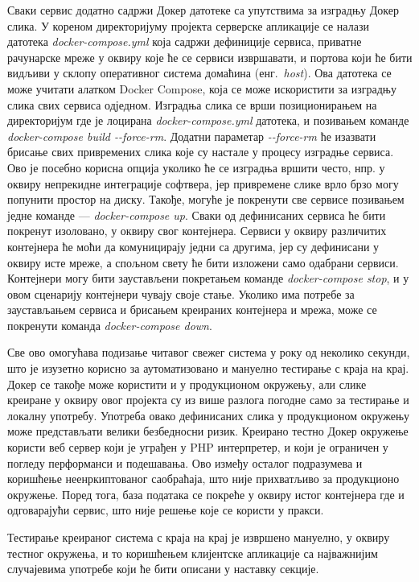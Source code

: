 \documentclass[12pt,oneside]{memoir}
\begin{document}
Сваки сервис додатно садржи Докер датотеке са упутствима за изградњу Докер слика. У кореном директоријуму пројекта серверске апликације се налази датотека \textit{docker-compose.yml} која садржи дефиниције сервиса, приватне рачунарске мреже у оквиру које ће се сервиси извршавати, и портова који ће бити видљиви у склопу оперативног система домаћина (енг.~\textit{host}). Ова датотека се може учитати алатком Docker Compose, која се може искористити за изградњу слика свих сервиса одједном. Изградња слика се врши позиционирањем на директоријум где је лоцирана \textit{docker-compose.yml} датотека, и позивањем команде \textit{docker-compose build -{}-force-rm}. Додатни параметар \textit{-{}-force-rm} ће изазвати брисање свих привремених слика које су настале у процесу изградње сервиса. Ово је посебно корисна опција уколико ће се изградња вршити често, нпр. у оквиру непрекидне интеграције софтвера, јер привремене слике врло брзо могу попунити простор на диску. Такође, могуће је покренути све сервисе позивањем једне команде --- \textit{docker-compose up}. Сваки од дефинисаних сервиса ће бити покренут изоловано, у оквиру свог контејнера. Сервиси у оквиру различитих контејнера ће моћи да комуницирају једни са другима, јер су дефинисани у оквиру исте мреже, а спољном свету ће бити изложени само одабрани сервиси. Контејнери могу бити заустављени покретањем команде \textit{docker-compose stop}, и у овом сценарију контејнери чувају своје стање. Уколико има потребе за заустављањем сервиса и брисањем креираних контејнера и мрежа, може се покренути команда \textit{docker-compose down}.

Све ово омогућава подизање читавог свежег система у року од неколико секунди, што је изузетно корисно за аутоматизовано и мануелно тестирање с краја на крај. Докер се такође може користити и у продукционом окружењу, али слике креиране у оквиру овог пројекта су из више разлога погодне само за тестирање и локалну употребу. Употреба овако дефинисаних слика у продукционом окружењу може представљати велики безбедносни ризик. Креирано тестно Докер окружење користи веб сервер који је уграђен у PHP интерпретер, и који је ограничен у погледу перформанси и подешавања. Ово између осталог подразумева и коришћење неенркиптованог саобраћаја, што није прихватљиво за продукционо окружење. Поред тога, база података се покреће у оквиру истог контејнера где и одговарајући сервис, што није решење које се користи у пракси.

Тестирање креираног система с краја на крај је извршено мануелно, у оквиру тестног окружења, и то коришћењем клијентске апликације са најважнијим случајевима употребе који ће бити описани у наставку секције.
\end{document}
